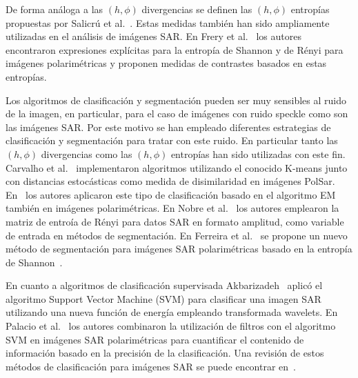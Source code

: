 \documentclass[11pt]{article}
\begin{document}
De forma análoga a las $(h,\phi)$ divergencias se definen las $(h,\phi)$ entropías propuestas por Salicrú et al.~\cite{salicruetal1993}. Estas medidas también han sido ampliamente utilizadas en el análisis de imágenes SAR. En Frery et al.~\cite{Frery2012} los autores encontraron expresiones explícitas para la entropía de Shannon y de Rényi para imágenes polarimétricas y proponen medidas de contrastes basados en estas entropías. 
  
Los algoritmos de clasificación y segmentación pueden ser muy sensibles al ruido de la imagen, en particular, para el caso de imágenes con ruido speckle como son las imágenes SAR. Por este motivo se han empleado diferentes estrategias de clasificación y segmentación para tratar con este ruido. En particular tanto las $(h,\phi)$ divergencias como las $(h,\phi)$ entropías han sido utilizadas con este fin. Carvalho et al.~\cite{Carvalho2019} implementaron algoritmos utilizando el conocido K-means junto con distancias estocásticas como medida de disimilaridad en imágenes PolSar. En~\cite{Fernandez2017} los autores aplicaron este tipo de clasificación basado en el algoritmo EM también en imágenes polarimétricas. En Nobre et al.~\cite{Nobre2016} los autores emplearon la matriz de entroía de Rényi para datos SAR en formato amplitud, como variable de entrada en métodos de segmentación. En Ferreira et al.~\cite{Ferreira2020} se propone un nuevo método de segmentación para imágenes SAR polarimétricas basado en la entropía de Shannon~\cite{Shannon1948}.   


En cuanto a algoritmos de clasificación supervisada Akbarizadeh~\cite{Akbarizadeh2012} aplicó el algoritmo Support Vector Machine (SVM) para clasificar una imagen SAR utilizando una nueva función de energía empleando transformada wavelets. En Palacio et al.~\cite{Palacio2019} los autores combinaron la utilización de filtros con el algoritmo SVM en imágenes SAR polarimétricas para cuantificar el contenido de información basado en la precisión de la clasificación.  Una revisión de estos métodos de clasificación para imágenes SAR se puede encontrar en~\cite{Parikh2020}. 
\end{document}
